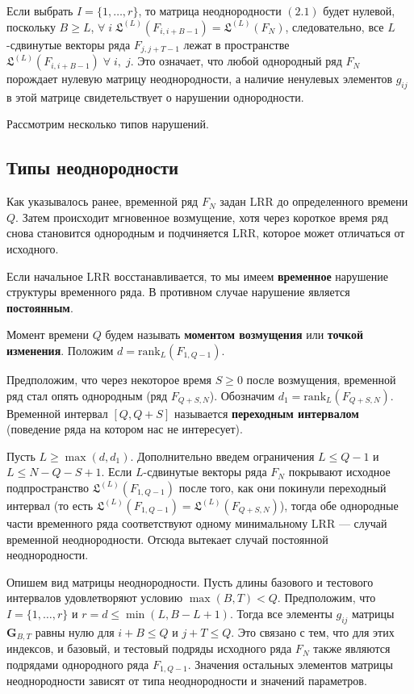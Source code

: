 \documentclass[specialist, substylefile = spbu.rtx,
			   subf, href, 12pt]{disser}
\begin{document}
Если выбрать $ I = \{1, \dots, r\} $, то матрица неоднородности $ (2.1) $ будет нулевой, поскольку $ B \geq L $, $ \forall \; i \; \mathfrak{L}^{(L)}(F_{i, i+B-1}) = \mathfrak{L}^{(L)}(F_N) $, следовательно, все $ L $-сдвинутые векторы ряда $ F_{j, j+T-1} $ лежат в пространстве $ \mathfrak{L}^{(L)}(F_{i, i+B-1}) \; \forall \; i,\; j $. Это означает, что любой однородный ряд $ F_N $ порождает нулевую матрицу неоднородности, а наличие ненулевых элементов $ g_{ij} $ в этой матрице свидетельствует о нарушении однородности.

Рассмотрим несколько типов нарушений.

\subsection{Типы неоднородности}

Как указывалось ранее, временной ряд $ F_N $ задан $ \mathrm{LRR} $ до определенного времени $ Q $. Затем происходит мгновенное возмущение, хотя через короткое время ряд снова становится однородным и подчиняется $ \mathrm{LRR} $, которое может отличаться от исходного.

Если начальное $ \mathrm{LRR} $ восстанавливается, то мы имеем \textbf{временное} нарушение структуры временного ряда. В противном случае нарушение является \textbf{постоянным}.

Момент времени $ Q $ будем называть \textbf{моментом возмущения} или \textbf{точкой изменения}. Положим $ d = \mathrm{rank}_L(F_{1, Q-1}) $.

Предположим, что через некоторое время $ S \geq 0 $ после возмущения, временной ряд стал опять однородным (ряд $ F_{Q+S, N} $). Обозначим $ d_1 = \mathrm{rank}_L(F_{Q+S, N}) $. Временной интервал $ [Q, Q + S] $ называется \textbf{переходным интервалом} (поведение ряда на котором нас не интересует).

Пусть $ L \geq \max(d, d_1) $. Дополнительно введем ограничения $ L \leq Q-1 $ и $ L \leq N-Q-S+1 $. Если $ L $-сдвинутые векторы ряда $ F_N $ покрывают исходное подпространство $ \mathfrak{L}^{(L)}(F_{1, Q-1}) $ после того, как они покинули переходный интервал (то есть  $ \mathfrak{L}^{(L)}(F_{1, Q-1}) = \mathfrak{L}^{(L)}(F_{Q+S, N})$), тогда обе однородные части временного ряда соответствуют одному минимальному $ \mathrm{LRR} $ --- случай временной неоднородности. Отсюда вытекает случай постоянной неоднородности.

Опишем вид матрицы неоднородности. Пусть длины базового и тестового интервалов удовлетворяют условию $ \max(B, T) < Q $. Предположим, что $ I = \{1, \dots, r\} $ и $ r = d \leq \min(L, B-L+1) $. Тогда все элементы $ g_{ij} $ матрицы $ \mathbf{G}_{B, T} $ равны нулю для $ i+B \leq Q $ и $ j+T \leq Q $. Это связано с тем, что для этих индексов, и базовый, и тестовый подряды исходного ряда $ F_N $ также являются подрядами однородного ряда $ F_{1, Q-1} $. Значения остальных элементов матрицы неоднородности зависят от типа неоднородности и значений параметров.
\end{document}
